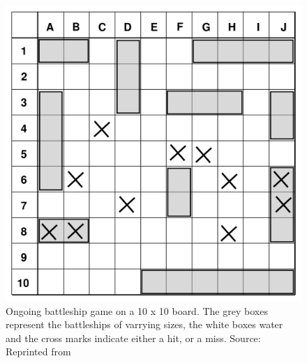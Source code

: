 \begin{figure}[H]
  \centering
  \includegraphics[scale=.25]{images/battleship}
  \caption[Battleship game board]{Ongoing battleship game on a 10 x 10 board. The grey boxes represent the battleships of varrying sizes, the white boxes water and the cross marks indicate either a hit, or a miss. Source: Reprinted from \cite{enwiki:1120935103}}
  \label{fig:battleship}
\end{figure}  